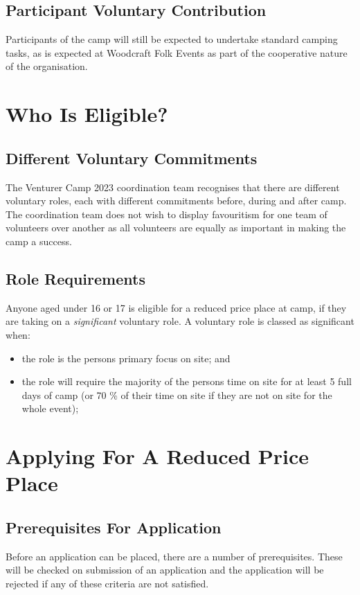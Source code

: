 \documentclass[a4paper, 11pt]{article}
\begin{document}
\subsection{Participant Voluntary Contribution}
Participants of the camp will still be expected to undertake standard camping tasks, as is expected at Woodcraft Folk Events as part of the cooperative nature of the organisation. 

\section{Who Is Eligible?}
\subsection{Different Voluntary Commitments}
The Venturer Camp 2023 coordination team recognises that there are different voluntary roles, each with different commitments before, during and after camp. The coordination team does not wish to display favouritism for one team of volunteers over another as all volunteers are equally as important in making the camp a success.

\subsection{Role Requirements}
Anyone aged under 16 or 17 is eligible for a reduced price place at camp, if they are taking on a \textit{significant} voluntary role. A voluntary role is classed as significant when:
\begin{itemize}
    \item the role is the persons primary focus on site; and
    \item the role will require the majority of the persons time on site for at least 5 full days of camp (or 70 \% of their time on site if they are not on site for the whole event);
\end{itemize}

\section{Applying For A Reduced Price Place}
\subsection{Prerequisites For Application}
Before an application can be placed, there are a number of prerequisites. These will be checked on submission of an application and the application will be rejected if any of these criteria are not satisfied.\\
\end{document}

